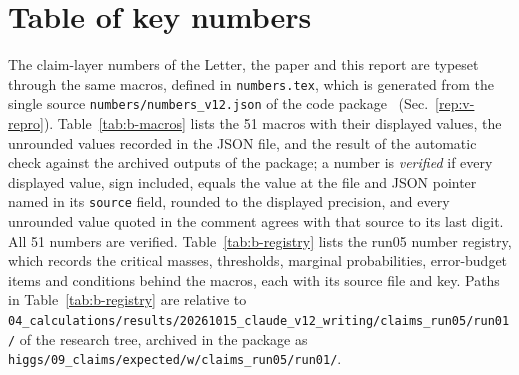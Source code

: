 \section{Table of key numbers}\label{rep:app-numbers}

The claim-layer numbers of the Letter, the paper and this report are typeset through the same macros, defined in \texttt{numbers.tex}, which is generated from the single source \texttt{numbers/numbers\_v12.json} of the code package~\cite{DNECv12code} (Sec.~\ref{rep:v-repro}).
Table~\ref{tab:b-macros} lists the 51 macros with their displayed values, the unrounded values recorded in the JSON file, and the result of the automatic check against the archived outputs of the package; a number is \emph{verified} if every displayed value, sign included, equals the value at the file and JSON pointer named in its \texttt{source} field, rounded to the displayed precision, and every unrounded value quoted in the comment agrees with that source to its last digit.
All 51 numbers are verified.
Table~\ref{tab:b-registry} lists the run05 number registry, which records the critical masses, thresholds, marginal probabilities, error-budget items and conditions behind the macros, each with its source file and key.
Paths in Table~\ref{tab:b-registry} are relative to \texttt{04\_\allowbreak{}calculations/\allowbreak{}results/\allowbreak{}20261015\_\allowbreak{}claude\_\allowbreak{}v12\_\allowbreak{}writing/\allowbreak{}claims\_\allowbreak{}run05/\allowbreak{}run01/\allowbreak{}} of the research tree, archived in the package as \texttt{higgs/09\_claims/expected/w/claims\_run05/run01/}.

